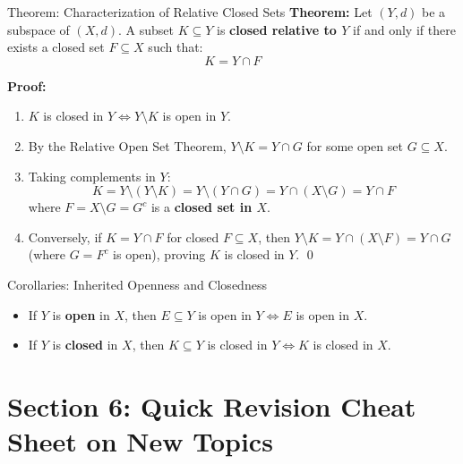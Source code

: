 \documentclass[11pt,a4paper]{article}
\begin{document}
\begin{exbox}{Theorem: Characterization of Relative Closed Sets}
\textbf{Theorem:} Let $(Y, d)$ be a subspace of $(X, d)$. A subset $K \subseteq Y$ is \textbf{closed relative to $Y$} if and only if there exists a closed set $F \subseteq X$ such that:
\begin{equation}
    K = Y \cap F
\end{equation}

\textbf{Proof:}
\begin{enumerate}
    \item $K$ is closed in $Y \iff Y \setminus K$ is open in $Y$.
    \item By the Relative Open Set Theorem, $Y \setminus K = Y \cap G$ for some open set $G \subseteq X$.
    \item Taking complements in $Y$:
    \begin{equation}
        K = Y \setminus (Y \setminus K) = Y \setminus (Y \cap G) = Y \cap (X \setminus G) = Y \cap F
    \end{equation}
    where $F = X \setminus G = G^c$ is a \textbf{closed set in $X$}.
    \item Conversely, if $K = Y \cap F$ for closed $F \subseteq X$, then $Y \setminus K = Y \cap (X \setminus F) = Y \cap G$ (where $G = F^c$ is open), proving $K$ is closed in $Y$. \qed
\end{enumerate}
\end{exbox}

\begin{formulabox}{Corollaries: Inherited Openness and Closedness}
\begin{itemize}
    \item If $Y$ is \textbf{open} in $X$, then $E \subseteq Y$ is open in $Y \iff E$ is open in $X$.
    \item If $Y$ is \textbf{closed} in $X$, then $K \subseteq Y$ is closed in $Y \iff K$ is closed in $X$.
\end{itemize}
\end{formulabox}

\section{Section 6: Quick Revision Cheat Sheet on New Topics}
\end{document}
